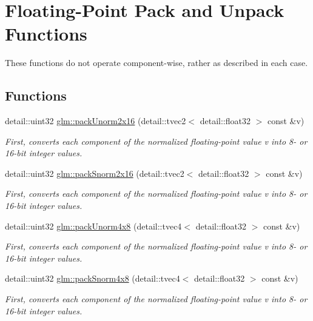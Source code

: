 \hypertarget{group__core__func__packing}{\section{Floating-\/\-Point Pack and Unpack Functions}
\label{group__core__func__packing}
}


These functions do not operate component-\/wise, rather as described in each case.  


\subsection*{Functions}
\begin{DoxyCompactItemize}
\item 
detail\-::uint32 \hyperlink{group__core__func__packing_ga38cc970d20075fda38a1725f668ec1e3}{glm\-::pack\-Unorm2x16} (detail\-::tvec2$<$ detail\-::float32 $>$ const \&v)
\begin{DoxyCompactList}\small\item\em First, converts each component of the normalized floating-\/point value v into 8-\/ or 16-\/bit integer values. \end{DoxyCompactList}\item 
detail\-::uint32 \hyperlink{group__core__func__packing_ga25db573698cb49ea4c4ef96bfcebecf3}{glm\-::pack\-Snorm2x16} (detail\-::tvec2$<$ detail\-::float32 $>$ const \&v)
\begin{DoxyCompactList}\small\item\em First, converts each component of the normalized floating-\/point value v into 8-\/ or 16-\/bit integer values. \end{DoxyCompactList}\item 
detail\-::uint32 \hyperlink{group__core__func__packing_ga4b10d27c4f1f5be5936b49ccc0d661ec}{glm\-::pack\-Unorm4x8} (detail\-::tvec4$<$ detail\-::float32 $>$ const \&v)
\begin{DoxyCompactList}\small\item\em First, converts each component of the normalized floating-\/point value v into 8-\/ or 16-\/bit integer values. \end{DoxyCompactList}\item 
detail\-::uint32 \hyperlink{group__core__func__packing_ga642b59fa9588eee81bea2f35e1556aae}{glm\-::pack\-Snorm4x8} (detail\-::tvec4$<$ detail\-::float32 $>$ const \&v)
\begin{DoxyCompactList}\small\item\em First, converts each component of the normalized floating-\/point value v into 8-\/ or 16-\/bit integer values. \end{DoxyCompactList}\item 

\end{DoxyCompactItemize}
